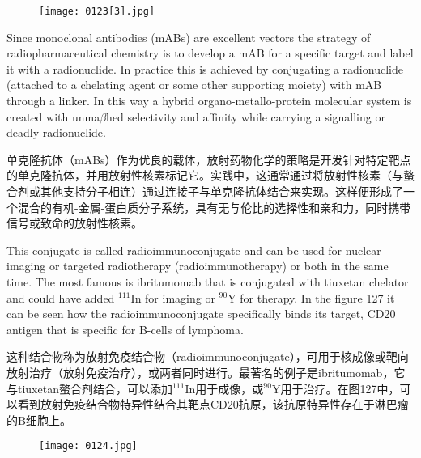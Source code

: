 \documentclass[dvipsnames, svgnames,a4paper,11pt]{article}
\begin{document}
\begin{figure}[h]
	\centering
    \texttt{[image: 0123[3].jpg]}    
     \label{fig126}
\end{figure}

Since monoclonal antibodies (mABs) are excellent vectors the strategy of
radiopharmaceutical chemistry is to develop a mAB for a specific target and label it
with a radionuclide. In practice this is achieved by conjugating a radionuclide
(attached to a chelating agent or some other supporting moiety) with mAB through a
linker. In this way a hybrid organo-metallo-protein molecular system is created with
unma$\beta$hed selectivity and affinity while carrying a signalling or deadly radionuclide.

单克隆抗体（mABs）作为优良的载体，放射药物化学的策略是开发针对特定靶点的单克隆抗体，并用放射性核素标记它。实践中，这通常通过将放射性核素（与螯合剂或其他支持分子相连）通过连接子与单克隆抗体结合来实现。这样便形成了一个混合的有机-金属-蛋白质分子系统，具有无与伦比的选择性和亲和力，同时携带信号或致命的放射性核素。



This conjugate is called radioimmunoconjugate and can be used for nuclear imaging
or targeted radiotherapy (radioimmunotherapy) or both in the same time. The most
famous is ibritumomab that is conjugated with tiuxetan chelator and could have
added ${}^{111}\mathrm{In}$ for imaging or \(\mathrm{{}^{90}Y}\) for therapy. In the figure 127 it can be seen how the
radioimmunoconjugate specifically binds its target, CD20 antigen that is specific for
B-cells of lymphoma.

这种结合物称为放射免疫结合物（radioimmunoconjugate），可用于核成像或靶向放射治疗（放射免疫治疗），或两者同时进行。最著名的例子是ibritumomab，它与tiuxetan螯合剂结合，可以添加${}^{111}\mathrm{In}$用于成像，或\(\mathrm{{}^{90}Y}\)用于治疗。在图127中，可以看到放射免疫结合物特异性结合其靶点CD20抗原，该抗原特异性存在于淋巴瘤的B细胞上。

\begin{figure}[h]
	\centering
    \texttt{[image: 0124.jpg]}    
     \label{fig127}
\end{figure}
\end{document}

